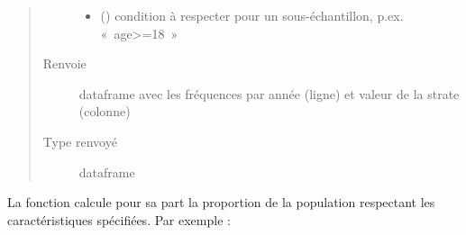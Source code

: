 \documentclass[letterpaper,10pt,french]{sphinxmanual}
\begin{document}
\begin{fulllineitems}
\begin{fulllineitems}
\begin{quote}
\begin{description}
\begin{itemize}
\item {} 
 () \textendash{} condition à respecter pour un sous-échantillon, p.ex. « age\textgreater{}=18 »

\end{itemize}

\item[{Renvoie}] \leavevmode
dataframe avec les fréquences par année (ligne) et valeur de la strate (colonne)

\item[{Type renvoyé}] \leavevmode
dataframe

\end{description}\end{quote}

\end{fulllineitems}


\end{fulllineitems}


\begin{DUlineblock}{0em}
\item[] 
\end{DUlineblock}

La fonction  calcule pour sa part la proportion de la population respectant les caractéristiques spécifiées. Par exemple :

\begin{sphinxVerbatim}[commandchars=\\\{\}]
   
\end{sphinxVerbatim}

\end{document}
